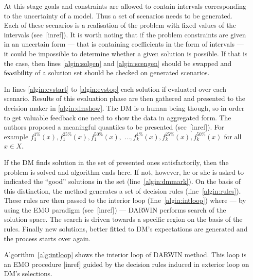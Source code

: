 At this stage goals and constraints are allowed to contain intervals
corresponding to the uncertainty of a model. Thus a set of scenarios needs to
be generated. Each of these scenarios is a realisation of the problem with
fixed values of the intervals (see~[inref]). It is worth noting that if the
problem constraints are given in an uncertain form --- that is containing
coefficients in the form of intervals --- it could be impossible to determine
whether a given solution is possible. If that is the case, then lines
\ref{algin:solgen} and \ref{algin:scengen} should be swapped and feasibility
of a solution set should be checked on generated scenarios.

In lines \ref{algin:evstart} to \ref{algin:evstop} each solution if evaluated
over each scenario. Results of this evaluation phase are then gathered and
presented to the decision maker in \ref{algin:dmshow}. The DM is a human being
though, so in order to get valuable feedback one need to show the data in
aggregated form. The authors proposed a meaningful quantiles to be presented
(see~[inref]). For example $f^{1\%}_1(x), f^{25\%}_1(x), f^{50\%}_1(x),$
$\dots, f^{1\%}_k(x), f^{25\%}_k(x), f^{50\%}_k(x)$ for all $x \in X$.

If the DM finds solution in the set of presented ones satisfactorily, then the
problem is solved and algorithm ends here. If not, however, he or she is asked
to indicated the ``good'' solutions in the set (line~\ref{algin:dmmark}).  On
the basis of this distinction, the method generates a set of decision rules
(line~\ref{algin:rules}). These rules are then passed to the interior loop
(line~\ref{algin:intloop}) where --- by using the EMO paradigm (see~[inref])
--- DARWIN performs search of the solution space. The search is driven towards
a specific region on the basis of the rules. Finally new solutions, better
fitted to DM's expectations are generated and the process starts over again.

Algorithm~\ref{alg:intloop} shows the interior loop of DARWIN method. This
loop is an EMO procedure [inref] guided by the decision rules induced in
exterior loop on DM's selections.

